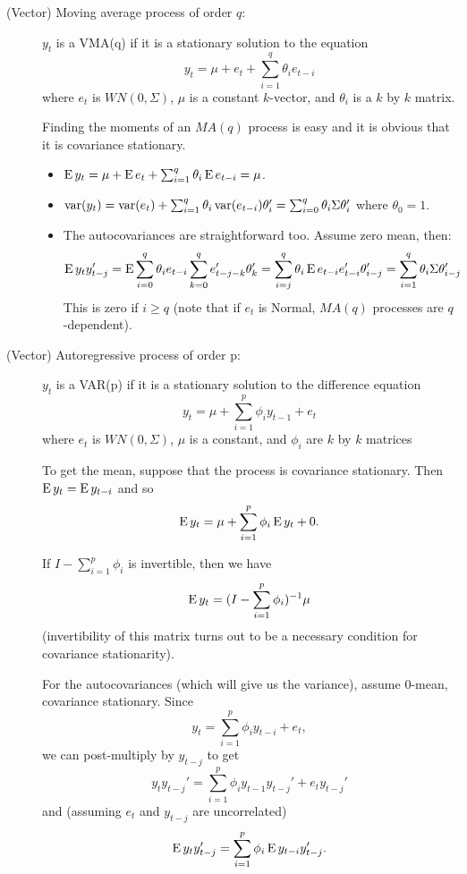 \begin{description}
\item[(Vector) Moving average process of order $q$:]

  $y_t$ is a VMA(q) if it is a stationary solution to the equation
  \[y_t = \mu + e_t + \sum_{i=1}^q \theta_i e_{t-i}\] where $e_t$ is $WN(0,
  \Sigma)$, $\mu$ is a constant $k$-vector, and $\theta_i$ is a $k$ by $k$ matrix.

  Finding the moments of an $MA(q)$ process is easy and it is obvious
  that it is covariance stationary.

  \begin{itemize}
  \item $\operatorname{E} y_t = \mu + \operatorname{E} e_t + \sum_{i=1}^q \theta_i \operatorname{E} e_{t-i} = \mu$.
  \item $\operatorname{var}(y_t) = \operatorname{var}(e_t) + \sum_{i=1}^q \theta_i \operatorname{var}(e_{t-i}) \theta_i' =
    \sum_{i=0}^q \theta_i \Sigma \theta_i'$ where $\theta_0 = 1$.
  \item The autocovariances are straightforward too. Assume zero mean,
    then:
    \[\operatorname{E} y_t y_{t-j}' = \operatorname{E} \sum_{i=0}^q \theta_i e_{t-i} \sum_{k=0}^q e_{t-j-k}' \theta_k'
    = \sum_{i=j}^q \theta_i \operatorname{E} e_{t-i} e_{t-i}' \theta_{i-j}'
    = \sum_{i=1}^q \theta_i \Sigma \theta_{i-j}'\]
    This is zero if $i \geq q$ (note that if $e_t$ is Normal, $MA(q)$
    processes are $q$-dependent).
  \end{itemize}
\item[(Vector) Autoregressive process of order p:]
  $y_t$ is a VAR(p) if it is a stationary solution to the difference
  equation
  \[y_t = \mu + \sum_{i=1}^p \phi_i y_{t-1} + e_t\]
  where $e_t$ is $WN(0, \Sigma)$, $\mu$ is a constant, and $\phi_i$ are $k$ by
  $k$ matrices

  To get the mean, suppose that the process is covariance
  stationary. Then $\operatorname{E} y_t = \operatorname{E} y_{t-i}$ and so
  \[\operatorname{E} y_t = \mu + \sum_{i=1}^p \phi_i \operatorname{E} y_t + 0.\]

  If $I - \sum_{i=1}^p \phi_i$ is invertible, then we have
  \[\operatorname{E} y_t = (I - \sum_{i=1}^p \phi_i )^{-1} \mu\]
  (invertibility of this matrix turns out to be a necessary condition
  for covariance stationarity).

  For the autocovariances (which will give us the variance), assume
  0-mean, covariance stationary. Since
  \[y_t = \sum_{i=1}^p \phi_i y_{t-i} + e_t,\]
  we can post-multiply by $y_{t-j}$ to get
  \[y_t y_{t-j}' = \sum_{i=1}^p \phi_i y_{t-1} y_{t-j}' + e_t y_{t-j}'\]
  and (assuming $e_t$ and $y_{t-j}$ are uncorrelated)
  \[\operatorname{E} y_t y_{t-j}' = \sum_{i=1}^p \phi_i \operatorname{E} y_{t-i} y_{t-j}'.\]


\end{description}
